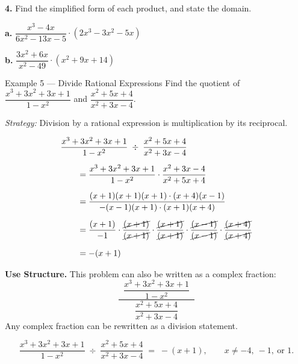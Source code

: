 \documentclass[11pt]{article}
\newcommand{\workspace}[1]{\vspace{#1}}
\begin{document}
\begin{tryit}
\textbf{4.} Find the simplified form of each product, and state the domain.

\vspace{0.3em}
\begin{minipage}[t]{0.48\textwidth}
\textbf{a.} $\dfrac{x^{3}-4x}{6x^{2}-13x-5}\cdot (2x^{3}-3x^{2}-5x)$
\workspace{3.8cm}
\end{minipage}\hfill
\begin{minipage}[t]{0.48\textwidth}
\textbf{b.} $\dfrac{3x^{2}+6x}{x^{2}-49}\cdot (x^{2}+9x+14)$
\workspace{3.8cm}
\end{minipage}
\end{tryit}

\newpage

\begin{example}{Example 5 --- Divide Rational Expressions}
Find the quotient of $\dfrac{x^{3}+3x^{2}+3x+1}{1-x^{2}}$ and $\dfrac{x^{2}+5x+4}{x^{2}+3x-4}$.

\vspace{0.4em}
\textit{Strategy:} Division by a rational expression is multiplication by its reciprocal.

\begin{align*}
&\dfrac{x^{3}+3x^{2}+3x+1}{1-x^{2}}\;\div\;\dfrac{x^{2}+5x+4}{x^{2}+3x-4} \\[6pt]
&\qquad = \dfrac{x^{3}+3x^{2}+3x+1}{1-x^{2}}\cdot \dfrac{x^{2}+3x-4}{x^{2}+5x+4} \\[6pt]
&\qquad = \dfrac{(x+1)(x+1)(x+1)\cdot (x+4)(x-1)}{-(x-1)(x+1)\cdot (x+1)(x+4)} \\[6pt]
&\qquad = \dfrac{(x+1)}{-1}\cdot \dfrac{\cancel{(x+1)}}{\cancel{(x+1)}}\cdot \dfrac{\cancel{(x+1)}}{\cancel{(x+1)}}\cdot \dfrac{\cancel{(x-1)}}{\cancel{(x-1)}}\cdot \dfrac{\cancel{(x+4)}}{\cancel{(x+4)}} \\[6pt]
&\qquad = -(x+1)
\end{align*}

\begin{annot}
\textbf{Use Structure.} This problem can also be written as a complex fraction:
\[
\dfrac{\;\;\dfrac{x^{3}+3x^{2}+3x+1}{1-x^{2}}\;\;}{\;\;\dfrac{x^{2}+5x+4}{x^{2}+3x-4}\;\;}
\]
Any complex fraction can be rewritten as a division statement.
\end{annot}

\[
\dfrac{x^{3}+3x^{2}+3x+1}{1-x^{2}} \;\div\; \dfrac{x^{2}+5x+4}{x^{2}+3x-4} \;=\; -(x+1), \qquad x \neq -4,\ -1,\ \text{or } 1.
\]
\end{example}
\end{document}
